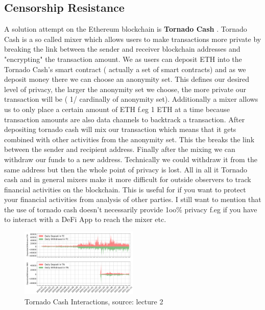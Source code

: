 \documentclass{article}
\begin{document}
\subsection{Censorship Resistance}
A solution attempt on the Ethereum blockchain is \textbf{Tornado Cash} . Tornado Cash is a so called mixer which allows users to make transactions more private by breaking the link between the sender and receiver blockchain addresses and "encrypting" the transaction amount. We as users can deposit ETH into the Tornado Cash's smart contract ( actually a set of smart contracts) and as we deposit money there we can choose an anonymity set. This defines our desired level of privacy, the larger the anonymity set we choose, the more private our transaction will be ( 1/ cardinally of anonymity set). Additionally a mixer allows us to only place a certain amount of ETH f.eg 1 ETH  at a time because transaction amounts are also data channels to backtrack a transaction. After depositing tornado cash will mix our transaction which means that it gets combined with other activities from the anonymity set. This the breaks the link between the sender and recipient address. Finally after the mixing we can withdraw our funds to a new address. Technically we could withdraw it from the same address but then the whole point of privacy is lost. All in all it Tornado cash and in general mixers make it more difficult for outside observers to track financial activities on the blockchain. This is useful for if you want to  protect your financial activities from analysis of other parties. I still want to mention that the use of tornado  cash doesn't necessarily provide 1oo\% privacy f.eg if you have to interact with a DeFi App to reach the mixer etc.
\begin{figure}[h]
    \centering
    \includegraphics[width=0.5\textwidth]{tc.png} %
    \caption{Tornado Cash Interactions, \scriptsize{source: lecture 2}}
    \label{fig:image-example}
\end{figure}
\end{document}
